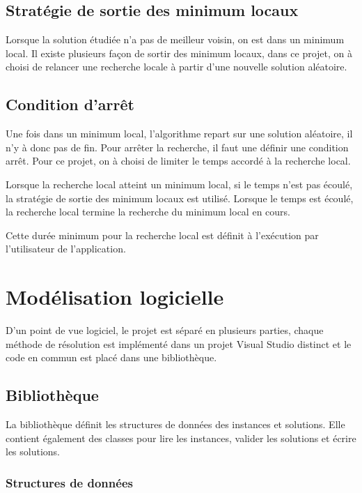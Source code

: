 \subsection{Stratégie de sortie des minimum locaux}
Lorsque la solution étudiée n'a pas de meilleur voisin, on est dans un minimum local.
Il existe plusieurs façon de sortir des minimum locaux, dans ce projet, on à choisi de relancer une recherche locale à partir d'une nouvelle solution aléatoire.


\subsection{Condition d'arrêt}
Une fois dans un minimum local, l'algorithme repart sur une solution aléatoire, il n'y à donc pas de fin.
Pour arrêter la recherche, il faut une définir une condition arrêt.
Pour ce projet, on à choisi de limiter le temps accordé à la recherche local.

Lorsque la recherche local atteint un minimum local, si le temps n'est pas écoulé, la stratégie de sortie des minimum locaux est utilisé.
Lorsque le temps est écoulé, la recherche local termine la recherche du minimum local en cours.

Cette durée minimum pour la recherche local est définit à l'exécution par l'utilisateur de l'application.

\section{Modélisation logicielle}

D'un point de vue logiciel, le projet est séparé en plusieurs parties, 
chaque méthode de résolution est implémenté dans un projet Visual Studio distinct et
le code en commun est placé dans une bibliothèque.

\subsection{Bibliothèque}

La bibliothèque définit les structures de données des instances et solutions.
Elle contient également des classes pour lire les instances, valider les solutions et écrire les solutions.

\subsubsection{Structures de données}

